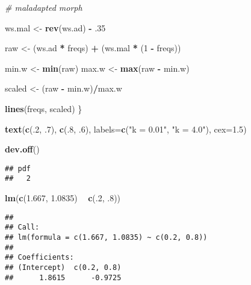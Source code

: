\documentclass[]{article}
\newenvironment{Shaded}{\begin{snugshade}}{\end{snugshade}}
\newcommand{\KeywordTok}[1]{\textcolor[rgb]{0.13,0.29,0.53}{\textbf{#1}}}
\newcommand{\DataTypeTok}[1]{\textcolor[rgb]{0.13,0.29,0.53}{#1}}
\newcommand{\DecValTok}[1]{\textcolor[rgb]{0.00,0.00,0.81}{#1}}
\newcommand{\FloatTok}[1]{\textcolor[rgb]{0.00,0.00,0.81}{#1}}
\newcommand{\StringTok}[1]{\textcolor[rgb]{0.31,0.60,0.02}{#1}}
\newcommand{\CommentTok}[1]{\textcolor[rgb]{0.56,0.35,0.01}{\textit{#1}}}
\newcommand{\OperatorTok}[1]{\textcolor[rgb]{0.81,0.36,0.00}{\textbf{#1}}}
\newcommand{\NormalTok}[1]{#1}
\begin{document}
\begin{Shaded}
\begin{Highlighting}[]
  
  \CommentTok{# maladapted morph}
  
\NormalTok{  ws.mal <-}\StringTok{ }\KeywordTok{rev}\NormalTok{(ws.ad) }\OperatorTok{-}\StringTok{ }\NormalTok{.}\DecValTok{35} 
  
\NormalTok{  raw <-}\StringTok{ }\NormalTok{(ws.ad }\OperatorTok{*}\StringTok{ }\NormalTok{freqs) }\OperatorTok{+}\StringTok{ }\NormalTok{(ws.mal }\OperatorTok{*}\StringTok{ }\NormalTok{(}\DecValTok{1} \OperatorTok{-}\StringTok{ }\NormalTok{freqs))}
  
\NormalTok{  min.w <-}\StringTok{ }\KeywordTok{min}\NormalTok{(raw)}
\NormalTok{  max.w <-}\StringTok{ }\KeywordTok{max}\NormalTok{(raw }\OperatorTok{-}\StringTok{ }\NormalTok{min.w)}
  
\NormalTok{  scaled <-}\StringTok{ }\NormalTok{(raw }\OperatorTok{-}\StringTok{ }\NormalTok{min.w)}\OperatorTok{/}\NormalTok{max.w}
  
  \KeywordTok{lines}\NormalTok{(freqs, scaled)}
\NormalTok{\}}

\KeywordTok{text}\NormalTok{(}\KeywordTok{c}\NormalTok{(.}\DecValTok{2}\NormalTok{, .}\DecValTok{7}\NormalTok{), }\KeywordTok{c}\NormalTok{(.}\DecValTok{8}\NormalTok{, .}\DecValTok{6}\NormalTok{), }
     \DataTypeTok{labels=}\KeywordTok{c}\NormalTok{(}\StringTok{"k = 0.01"}\NormalTok{, }\StringTok{"k = 4.0"}\NormalTok{),}
     \DataTypeTok{cex=}\FloatTok{1.5}\NormalTok{)}

\KeywordTok{dev.off}\NormalTok{()}
\end{Highlighting}
\end{Shaded}

\begin{verbatim}
## pdf 
##   2
\end{verbatim}

\begin{Shaded}
\begin{Highlighting}[]
\KeywordTok{lm}\NormalTok{(}\KeywordTok{c}\NormalTok{(}\FloatTok{1.667}\NormalTok{, }\FloatTok{1.0835}\NormalTok{) }\OperatorTok{~}\StringTok{ }\KeywordTok{c}\NormalTok{(.}\DecValTok{2}\NormalTok{, .}\DecValTok{8}\NormalTok{))}
\end{Highlighting}
\end{Shaded}

\begin{verbatim}
## 
## Call:
## lm(formula = c(1.667, 1.0835) ~ c(0.2, 0.8))
## 
## Coefficients:
## (Intercept)  c(0.2, 0.8)  
##      1.8615      -0.9725
\end{verbatim}
\end{document}
